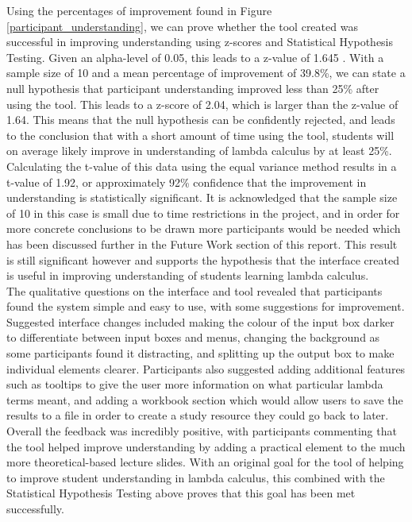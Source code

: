 \documentclass[a4paper,11pt]{report}
\begin{document}
Using the percentages of improvement found in Figure \ref{participant_understanding}, we can prove whether the tool created was successful in improving understanding using z-scores and Statistical Hypothesis Testing. Given an alpha-level of 0.05, this leads to a z-value of 1.645 \cite{ZTable2019}. With a sample size of 10 and a mean percentage of improvement of 39.8\%, we can state a null hypothesis that participant understanding improved less than 25\% after using the tool. This leads to a z-score of 2.04, which is larger than the z-value of 1.64. This means that the null hypothesis can be confidently rejected, and leads to the conclusion that with a short amount of time using the tool, students will on average likely improve in understanding of lambda calculus by at least 25\%.\\

Calculating the t-value of this data using the equal variance method \cite{TTest2019} results in a t-value of 1.92, or approximately 92\% confidence that the improvement in understanding is statistically significant. It is acknowledged that the sample size of 10 in this case is small due to time restrictions in the project, and in order for more concrete conclusions to be drawn more participants would be needed which has been discussed further in the Future Work section of this report. This result is still significant however and supports the hypothesis that the interface created is useful in improving understanding of students learning lambda calculus.\\

The qualitative questions on the interface and tool revealed that participants found the system simple and easy to use, with some suggestions for improvement. Suggested interface changes included making the colour of the input box darker to differentiate between input boxes and menus, changing the background as some participants found it distracting, and splitting up the output box to make individual elements clearer. Participants also suggested adding additional features such as tooltips to give the user more information on what particular lambda terms meant, and adding a workbook section which would allow users to save the results to a file in order to create a study resource they could go back to later.\\

Overall the feedback was incredibly positive, with participants commenting that the tool helped improve understanding by adding a practical element to the much more theoretical-based lecture slides. With an original goal for the tool of helping to improve student understanding in lambda calculus, this combined with the Statistical Hypothesis Testing above proves that this goal has been met successfully.
\end{document}
